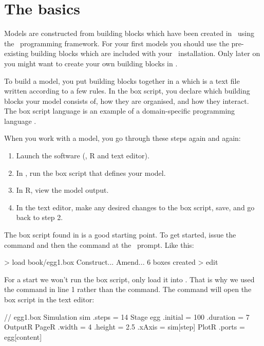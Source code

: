 \section{The basics}
Models are constructed from building blocks which have been created in \CPP\ using the \US\ programming framework. For your first models you should use the pre-existing building blocks which are included with your \US\ installation. Only later on you might want to create your own building blocks in \CPP.

To build a model, you put building blocks together in a  which is a text file written according to a few rules. In the box script, you declare which building blocks your model consists of, how they are organised, and how they interact. The box script language is an example of a domain-specific programming language \citep{HolstBelete}.

When you work with a model, you go through these steps again and again:

\begin{enumerate}
\item Launch the software (\US, R and text editor).
\item In \US, run the box script that defines your model.
\item In R, view the model output.
\item \label{NielsH} In the text editor, make any desired changes to the box script, save, and go back to step 2.
\end{enumerate}

The box script found in  is a good starting point. To get started, issue the  command and then the  command at the \US\ prompt. Like this:

\lstset{numbers=left}
\begin{usdialog}
> load book/egg1.box
Construct...
Amend...
6 boxes created
> edit
\end{usdialog}
\lstset{numbers=none}

For a start we won't run the box script, only load it into \US. That is why we used the  command in line 1 rather than the  command. The  command will open the box script in the text editor:

\lstset{numbers=left}
\begin{boxscript}
// egg1.box
Simulation sim {
  .steps = 14
  Stage egg {
    .initial = 100 
    .duration = 7
  }
  OutputR {
    PageR {
      .width = 4
      .height = 2.5
      .xAxis = sim[step]
      PlotR {
        .ports = egg[content]
      }
    }
  }
}
\end{boxscript}
\lstset{numbers=none}

